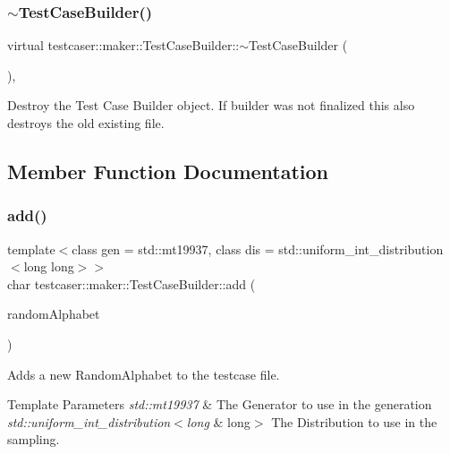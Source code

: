 \subsubsection{\texorpdfstring{$\sim$TestCaseBuilder()}{~TestCaseBuilder()}}
{\footnotesize\ttfamily virtual testcaser\+::maker\+::\+Test\+Case\+Builder\+::$\sim$\+Test\+Case\+Builder (\begin{DoxyParamCaption}{ }\end{DoxyParamCaption})\hspace{0.3cm}{\ttfamily [inline]}, {\ttfamily [virtual]}}



Destroy the Test Case Builder object. If builder was not finalized this also destroys the old existing file. 



\subsection{Member Function Documentation}
\mbox{\label{classtestcaser_1_1maker_1_1TestCaseBuilder_a26c5a045c2b1c4db64f4542aaee326aa}} 
\subsubsection{\texorpdfstring{add()}{add()}\hspace{0.1cm}{\footnotesize\ttfamily [1/11]}}
{\footnotesize\ttfamily template$<$class gen  = std\+::mt19937, class dis  = std\+::uniform\+\_\+int\+\_\+distribution$<$long long$>$$>$ \\
char testcaser\+::maker\+::\+Test\+Case\+Builder\+::add (\begin{DoxyParamCaption}\item[{\mbox{\hyperlink{classtestcaser_1_1maker_1_1types_1_1RandomAlphabet}{types\+::\+Random\+Alphabet}}$<$ gen, dis $>$ \&}]{random\+Alphabet }\end{DoxyParamCaption})\hspace{0.3cm}{\ttfamily [inline]}}



Adds a new Random\+Alphabet to the testcase file. 


\begin{DoxyTemplParams}{Template Parameters}
{\em std\+::mt19937} & The Generator to use in the generation \\
\hline
{\em std\+::uniform\+\_\+int\+\_\+distribution$<$long} & long$>$ The Distribution to use in the sampling. \\
\hline
\end{DoxyTemplParams}


